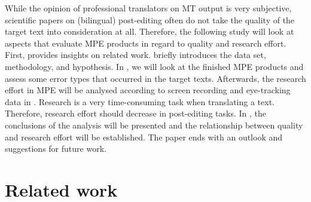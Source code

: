 \documentclass[output=paper]{langsci/langscibook}
\begin{document}
While the opinion of professional translators on MT output is very subjective, scientific papers on (bilingual) post-editing often do not take the quality of the target text into consideration at all. Therefore, the following study will look at aspects that evaluate MPE products in regard to quality and research effort. First,  provides insights on related work.  briefly introduces the data set, methodology, and hypothesis. In , we will look at the finished MPE products and assess some error types that occurred in the target texts. Afterwards, the research effort in MPE will be analysed according to screen recording and eye-tracking data in . Research is a very time-consuming task when translating a text. Therefore, research effort should decrease in post-editing tasks. In , the conclusions of the analysis will be presented and the relationship between quality and research effort will be established. The paper ends with an outlook and suggestions for future work.


\section{Related work\label{nitzke:sec:RelatedWork}}
\end{document}

